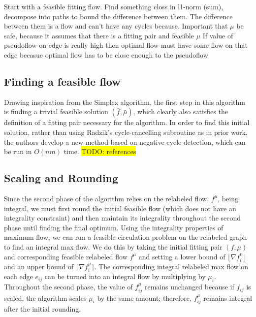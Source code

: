 \documentclass[11pt]{article}
\theoremstyle{definition}
\theoremstyle{definition}
\newcommand{\todo}[1]{\colorbox{yellow}{TODO: #1}}
\begin{document}
Start with a feasible fitting flow. Find something closs in l1-norm (sum), decompose into paths to bound the difference between them. The difference between them is a flow and can't have any cycles because.
Important that $\mu$ be safe, because it assumes that there is a fitting pair and feasible $\mu$
If value of pseudoflow on edge is really high then optimal flow must have some flow on that edge becasue optimal flow has to be close enough to the pseudoflow


    \subsection{Finding a feasible flow}
Drawing inspiration from the Simplex algorithm, the first step in this algorithm is finding a trivial feasible solution $(\bar{f}, \bar{\mu})$, which clearly also satisfies the definition of a fitting pair necessary for the algorithm. In order to find this initial solution, rather than using Radzik's cycle-cancelling subroutine as in prior work, the authors develop a new method based on negative cycle detection, which can be run in $O(nm)$ time. \todo{references} 
    
    \subsection{Scaling and Rounding} 
    Since the second phase of the algorithm relies on the relabeled flow, $f^\mu$, being integral, we must first round the initial feasible flow (which does not have an integrality constraint) and then maintain its integrality throughout the second phase until finding the final optimum. Using the integrality properties of maximum flow, we can run a feasible circulation problem on the relabeled graph to find an integral max flow. We do this by taking the initial fitting pair $(f, \mu)$ and corresponding feasible relabeled flow $f^\mu$ and setting a lower bound of $\lfloor \nabla f_i^\mu \rfloor$ and an upper bound of $\lceil \nabla f_i^\mu \rceil$. The corresponding integral relabeled max flow on each edge $e_{ij}$ can be turned into an integral flow by multiplying by $\mu_i$. Throughout the second phase, the value of $f_{ij}^\mu$ remains unchanged because if $f_{ij}$ is scaled, the algorithm scales $\mu_i$ by the same amount; therefore, $f_{ij}^\mu$ remains integral after the initial rounding.
    
\end{document}
